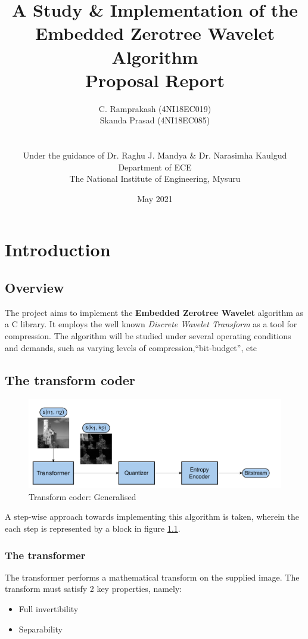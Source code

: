 \documentclass[a4paper,12pt]{report}
\title{A Study \& Implementation of the Embedded Zerotree Wavelet Algorithm \\ Proposal Report}
\author{
    C. Ramprakash (4NI18EC019) \\ Skanda Prasad (4NI18EC085)
    \\
    \\
    \hline
    \\
    Under the guidance of Dr. Raghu J. Mandya \& Dr. Narasimha Kaulgud
    \\
    Department of ECE
    \\
    The National Institute of Engineering, Mysuru
}
\date{May 2021}
\begin{document}
\maketitle

\tableofcontents

\chapter{Introduction}
\section{Overview}
The project aims to implement the \textbf{Embedded Zerotree Wavelet} algorithm
as a C library. It employs the well known \textit{Discrete Wavelet Transform}
as a tool for compression. The algorithm will be studied under several
operating conditions and demands, such as varying levels of
compression,``bit-budget'', etc

\section{The transform coder}

\begin{figure}[h]
    \centering
    \includegraphics[scale=0.5]{../img/block-diag_shrunk.pdf}
    \caption{Transform coder: Generalised \cite{shap1993}}
    \label{fig:tcoder}
\end{figure}

A step-wise approach towards implementing this algorithm is taken, wherein
the each step is represented by a block in figure \ref{fig:tcoder}.

\pagebreak

\subsection{The transformer}
The transformer performs a mathematical transform on the supplied image. The
transform must satisfy 2 key properties, namely:
\begin{itemize}
    \item Full invertibility
    \item Separability
\end{itemize}
\end{document}
